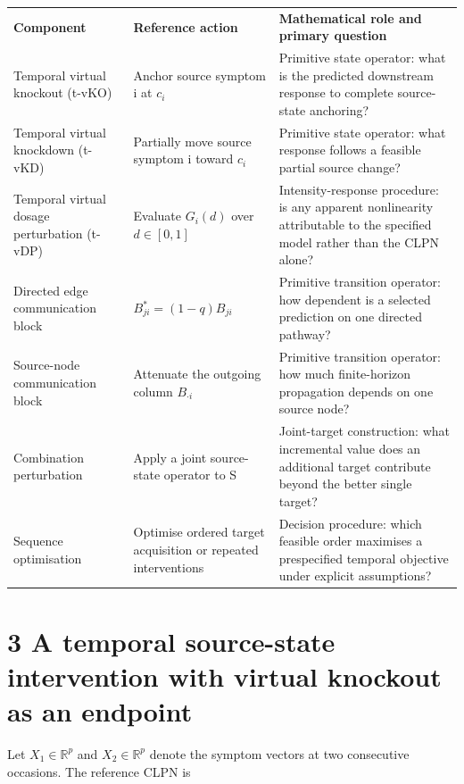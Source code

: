 \documentclass[11pt]{article}
\begin{document}
\begin{longtable}[]{@{}
  >{\raggedright\arraybackslash}p{}
  >{\raggedright\arraybackslash}p{}
  >{\raggedright\arraybackslash}p{}@{}}
\toprule\noalign{}
\endhead
\bottomrule\noalign{}
\endlastfoot
\textbf{Component} & \textbf{Reference action} & \textbf{Mathematical
role and primary question} \\
Temporal virtual knockout (t-vKO) & Anchor source symptom i at \(c_i\) &
Primitive state operator: what is the predicted downstream response to
complete source-state anchoring? \\
Temporal virtual knockdown (t-vKD) & Partially move source symptom i
toward \(c_i\) & Primitive state operator: what response follows a feasible
partial source change? \\
Temporal virtual dosage perturbation (t-vDP) & Evaluate \(G_i(d)\) over
\(d\in[0,1]\) & Intensity-response procedure: is any apparent nonlinearity
attributable to the specified model rather than the CLPN alone? \\
Directed edge communication block & \(B_{ji}^{\ast}=(1-q)B_{ji}\) & Primitive transition
operator: how dependent is a selected prediction on one directed
pathway? \\
Source-node communication block & Attenuate the outgoing column \(B_{\cdot i}\) &
Primitive transition operator: how much finite-horizon propagation
depends on one source node? \\
Combination perturbation & Apply a joint source-state operator to S &
Joint-target construction: what incremental value does an additional
target contribute beyond the better single target? \\
Sequence optimisation & Optimise ordered target acquisition or repeated
interventions & Decision procedure: which feasible order maximises a
prespecified temporal objective under explicit assumptions? \\
\end{longtable}

\section{3 A temporal source-state intervention with virtual knockout as
an
endpoint}\label{a-temporal-source-state-intervention-with-virtual-knockout-as-an-endpoint}

Let \(X_1\in\mathbb{R}^p\) and \(X_2\in\mathbb{R}^p\) denote the symptom vectors at two consecutive
occasions. The reference CLPN is
\end{document}
